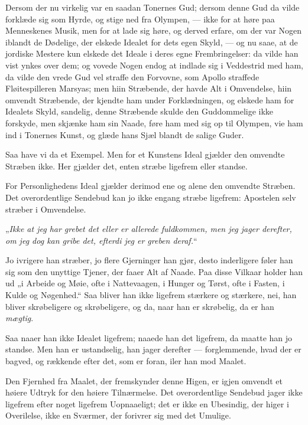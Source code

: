 \documentclass[12pt,a4paper]{book}
\newcommand{\apage}[1]{\marginnote{\footnotesize\textit{[#1]}}}
\begin{document}
Dersom der nu virkelig var en saadan Tonernes Gud; dersom denne
Gud da vilde forklæde sig som Hyrde, og stige
ned fra Olympen, --- ikke for at høre paa Menneskenes Musik, \apage{141} men
for at lade sig høre, og derved erfare, om der var Nogen iblandt de
Dødelige, der elskede Idealet for dets egen Skyld, --- og nu saae, at
de jordiske Mestere kun elskede det Ideale i deres egne
Frembringelser: da vilde han vist ynkes over dem; og vovede Nogen
endog at indlade sig i Veddestrid med ham, da vilde den vrede Gud
vel straffe den Forvovne, som Apollo straffede Fløitespilleren
Marsyas; men hiin Stræbende, der havde Alt i Omvendelse, hiin
omvendt Stræbende, der kjendte ham under Forklædningen, og
elskede ham for Idealets Skyld, sandelig, denne Stræbende skulde
den Guddommelige ikke forskyde, men skjænke ham sin Naade, føre
ham med sig op til Olympen, vie ham ind i Tonernes Kunst, og
glæde hans Sjæl blandt de salige Guder.

Saa have vi da et Exempel. Men for et Kunstens Ideal gjælder den
omvendte Stræben ikke. Her gjælder det, enten stræbe ligefrem eller
standse.

For Personlighedens Ideal gjælder derimod ene og alene den
omvendte Stræben. Det overordentlige Sendebud kan jo ikke
engang stræbe ligefrem: Apostelen selv stræber i Omvendelse.

„\emph{Ikke at jeg har grebet det eller er allerede fuldkommen, men
jeg jager derefter, om jeg dog kan gribe det, efterdi jeg er greben
deraf.}“

Jo ivrigere han stræber, jo flere Gjerninger han gjør, desto
inderligere føler han sig som den unyttige Tjener, der faaer Alt af
Naade. Paa disse Vilkaar holder han ud „i Arbeide og Møie, ofte i
Nattevaagen, i Hunger og Tørst, ofte i Fasten, i Kulde og
Nøgenhed.“ Saa bliver han ikke ligefrem stærkere og stærkere, nei,
han bliver skrøbeligere og skrøbeligere, og da, naar han er
skrøbelig, da er han \emph{mægtig}.

Saa naaer han ikke Idealet ligefrem; naaede han det ligefrem, da
maatte han jo standse. Men han er ustandselig,
han jager derefter --- forglemmende, hvad der er bagved, og
rækkende efter det, som er foran, iler han mod Maalet.

Den Fjernhed fra Maalet, \apage{142} der fremskynder denne Higen, er igjen
omvendt et høiere Udtryk for den høiere Tilnærmelse. Det
overordentlige Sendebud jager ikke ligefrem efter noget ligefrem
Uopnaaeligt; det er ikke en Ubesindig, der higer i Overilelse, ikke
en Sværmer, der forivrer sig med det Umulige.
\end{document}
